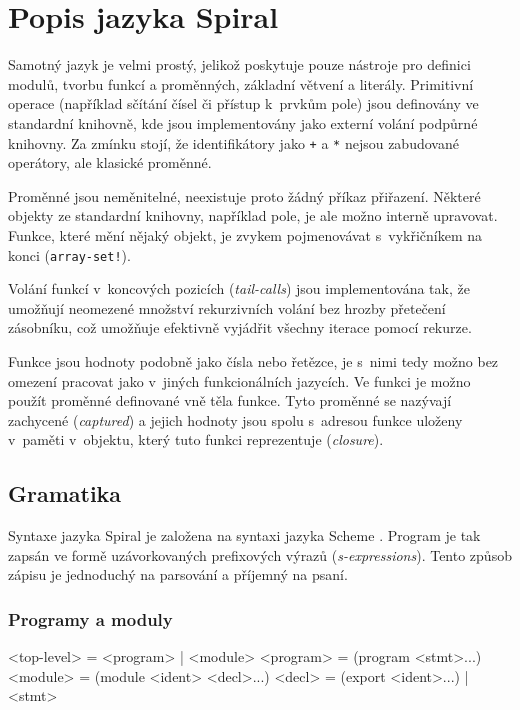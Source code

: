 \chapter{Popis jazyka Spiral}

Samotný jazyk je velmi prostý, jelikož poskytuje pouze nástroje pro definici
modulů, tvorbu funkcí a proměnných, základní větvení a literály.  Primitivní
operace (například sčítání čísel či přístup k~prvkům pole) jsou definovány ve
standardní knihovně, kde jsou implementovány jako externí volání podpůrné
knihovny. Za zmínku stojí, že identifikátory jako \texttt{+} a \texttt{*} nejsou
zabudované operátory, ale klasické proměnné. 

Proměnné jsou neměnitelné, neexistuje proto žádný příkaz přiřazení. Některé
objekty ze standardní knihovny, například pole, je ale možno interně upravovat.
Funkce, které mění nějaký objekt, je zvykem pojmenovávat s~vykřičníkem na konci
(\texttt{array-set!}).

Volání funkcí v~koncových pozicích (\emph{tail-calls}) jsou implementována tak,
že umožňují neomezené množství rekurzivních volání bez hrozby přetečení
zásobníku, což umožňuje efektivně vyjádřit všechny iterace pomocí rekurze.

Funkce jsou hodnoty podobně jako čísla nebo řetězce, je s~nimi tedy možno bez
omezení pracovat jako v~jiných funkcionálních jazycích. Ve funkci je možno
použít proměnné definované vně těla funkce. Tyto proměnné se nazývají zachycené
(\emph{captured}) a jejich hodnoty jsou spolu s~adresou funkce uloženy v~paměti
v~objektu, který tuto funkci reprezentuje (\emph{closure}).

\section{Gramatika}

Syntaxe jazyka Spiral je založena na syntaxi jazyka Scheme \cite{scheme7}.
Program je tak zapsán ve formě uzávorkovaných prefixových výrazů
(\emph{s-expressions}). Tento způsob zápisu je jednoduchý na parsování a
příjemný na psaní.

\subsection{Programy a moduly}
\begin{ttcode}
<top-level>   = <program> | <module>
<program>     = (program <stmt>...)
<module>      = (module <ident> <decl>...)
<decl>        = (export <ident>...) | <stmt>
\end{ttcode}

